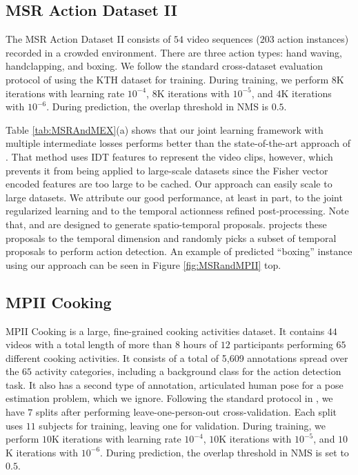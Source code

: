 \documentclass[10pt,twocolumn,letterpaper]{article}
\begin{document}
\subsection{MSR Action Dataset II}
The MSR Action Dataset II \cite{MSR_action_II_PAMI11} consists of $54$ video sequences ($203$ action instances) recorded in a crowded environment. There are three action types: hand waving, handclapping, and boxing. We follow the standard cross-dataset evaluation protocol of using the KTH dataset for training.  During training, we perform $8$K iterations with learning rate $10^{-4}$, $8$K iterations with $10^{-5}$, and $4$K iterations with $10^{-6}$. During prediction, the overlap threshold in NMS is $0.5$.

Table \ref{tab:MSRAndMEX}(a) shows that our joint learning framework with multiple intermediate losses performs better than the state-of-the-art approach of \cite{fast_temporal_action_proposal_fabian_cvpr16}. That method uses IDT features to represent the video clips, however, which prevents it from being applied to large-scale datasets since the Fisher vector encoded features are too large to be cached. Our approach can easily scale to large datasets. We attribute our good performance, at least in part, to the joint regularized learning and to the temporal actionness refined post-processing. Note that, \cite{yu_FAP_cvpr15} and \cite{APT_Gemert_bmvc15} are designed to generate spatio-temporal proposals. \cite{fast_temporal_action_proposal_fabian_cvpr16} projects these proposals to the temporal dimension and randomly picks a subset of temporal proposals to perform action detection. An example of predicted ``boxing'' instance using our approach can be seen in Figure \ref{fig:MSRandMPII} top.

\subsection{MPII Cooking}
MPII Cooking \cite{MPII_cooking_cvpr12} is a large, fine-grained cooking activities dataset. It contains $44$ videos with a total length of more than $8$ hours of $12$ participants performing $65$ different cooking activities. It consists of a total of 5,609 annotations spread over the $65$ activity categories, including a background class for the action detection task. It also has a second type of annotation, articulated human pose for a pose estimation problem, which we ignore. Following the standard protocol in \cite{MPII_cooking_cvpr12}, we have $7$ splits after performing leave-one-person-out cross-validation. Each split uses $11$ subjects for training, leaving one for validation. During training, we perform $10$K iterations with learning rate $10^{-4}$, $10$K iterations with $10^{-5}$, and $10$K iterations with $10^{-6}$. During prediction, the overlap threshold in NMS is set to $0.5$.
\end{document}
